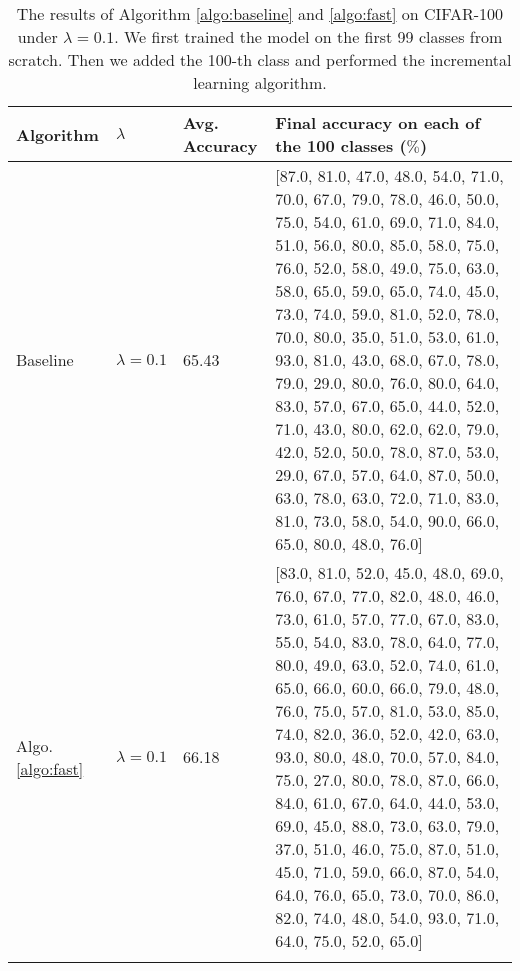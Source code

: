\begin{table}[!hpb]
	\centering
	\caption[The results of Algorithm \ref{algo:baseline} and \ref{algo:fast} on CIFAR-100 under $\lambda=0.1$]
	{The results of Algorithm \ref{algo:baseline} and \ref{algo:fast} on CIFAR-100 under $\lambda=0.1$. We first trained the model on the first 99 classes from scratch. Then we added the 100-th class and performed the incremental learning algorithm.}
	\begin{tabular}{@{}lllp{8cm}@{}} \toprule
		Algorithm & $\lambda$ &Avg. Accuracy&  Final accuracy on each of the 100 classes ($\%$)\\ \midrule
		Baseline&$\lambda=0.1$&  65.43& [87.0, 81.0, 47.0, 48.0, 54.0, 71.0, 70.0, 67.0, 79.0, 78.0, 46.0, 50.0, 75.0, 54.0, 61.0, 69.0, 71.0, 84.0, 51.0, 56.0, 80.0, 85.0, 58.0, 75.0, 76.0, 52.0, 58.0, 49.0, 75.0, 63.0, 58.0, 65.0, 59.0, 65.0, 74.0, 45.0, 73.0, 74.0, 59.0, 81.0, 52.0, 78.0, 70.0, 80.0, 35.0, 51.0, 53.0, 61.0, 93.0, 81.0, 43.0, 68.0, 67.0, 78.0, 79.0, 29.0, 80.0, 76.0, 80.0, 64.0, 83.0, 57.0, 67.0, 65.0, 44.0, 52.0, 71.0, 43.0, 80.0, 62.0, 62.0, 79.0, 42.0, 52.0, 50.0, 78.0, 87.0, 53.0, 29.0, 67.0, 57.0, 64.0, 87.0, 50.0, 63.0, 78.0, 63.0, 72.0, 71.0, 83.0, 81.0, 73.0, 58.0, 54.0, 90.0, 66.0, 65.0, 80.0, 48.0, 76.0]\\
		Algo. \ref{algo:fast}&$\lambda=0.1$&  66.18& [83.0, 81.0, 52.0, 45.0, 48.0, 69.0, 76.0, 67.0, 77.0, 82.0, 48.0, 46.0, 73.0, 61.0, 57.0, 77.0, 67.0, 83.0, 55.0, 54.0, 83.0, 78.0, 64.0, 77.0, 80.0, 49.0, 63.0, 52.0, 74.0, 61.0, 65.0, 66.0, 60.0, 66.0,
		79.0, 48.0, 76.0, 75.0, 57.0, 81.0, 53.0, 85.0, 74.0, 82.0, 36.0, 52.0, 42.0, 63.0, 93.0, 80.0, 48.0, 70.0, 57.0, 84.0, 75.0, 27.0, 80.0, 78.0, 87.0, 66.0, 84.0, 61.0, 67.0, 64.0, 44.0, 53.0, 69.0, 45.0,
		88.0, 73.0, 63.0, 79.0, 37.0, 51.0, 46.0, 75.0, 87.0, 51.0, 45.0, 71.0, 59.0, 66.0, 87.0, 54.0, 64.0, 76.0, 65.0, 73.0, 70.0, 86.0, 82.0, 74.0, 48.0, 54.0, 93.0, 71.0, 64.0, 75.0, 52.0, 65.0]
		\\ \bottomrule
		\label{tab:fast0.1}
	\end{tabular}
\end{table}
